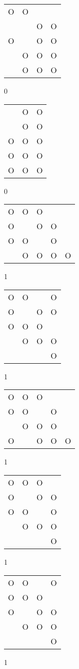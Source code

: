\begin{tabular}{|m{0.2cm}m{0.2cm}m{0.2cm}m{0.2cm}|}\hline
O&O& & \\
 & &O&O\\
O& &O&O\\
 &O&O&O\\
 &O&O&O\\
\hline\end{tabular}0
\begin{tabular}{|m{0.2cm}m{0.2cm}m{0.2cm}|}\hline
 &O&O\\
 &O&O\\
O&O&O\\
O&O&O\\
O&O&O\\
\hline\end{tabular}0
\begin{tabular}{|m{0.2cm}m{0.2cm}m{0.2cm}m{0.2cm}m{0.2cm}|}\hline
O&O&O& & \\
O& &O&O& \\
O&O& &O& \\
 &O&O&O&O\\
\hline\end{tabular}1
\begin{tabular}{|m{0.2cm}m{0.2cm}m{0.2cm}m{0.2cm}|}\hline
O&O& &O\\
O& &O&O\\
O&O&O& \\
 &O&O&O\\
 & & &O\\
\hline\end{tabular}1
\begin{tabular}{|m{0.2cm}m{0.2cm}m{0.2cm}m{0.2cm}m{0.2cm}|}\hline
O&O&O& & \\
O&O& &O& \\
 &O&O&O& \\
O& &O&O&O\\
\hline\end{tabular}1
\begin{tabular}{|m{0.2cm}m{0.2cm}m{0.2cm}m{0.2cm}|}\hline
O&O&O& \\
O& &O&O\\
O&O& &O\\
 &O&O&O\\
 & & &O\\
\hline\end{tabular}1
\begin{tabular}{|m{0.2cm}m{0.2cm}m{0.2cm}m{0.2cm}|}\hline
O&O& &O\\
O&O&O& \\
O& &O&O\\
 &O&O&O\\
 & & &O\\
\hline\end{tabular}1
